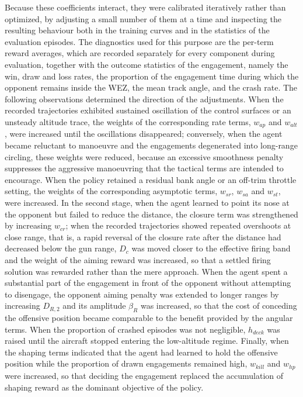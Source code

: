 \documentclass[pdflatex,sn-mathphys-num]{sn-jnl}%
\theoremstyle{thmstyleone}%
\theoremstyle{thmstyletwo}%
\theoremstyle{thmstylethree}%
\begin{document}
Because these coefficients interact, they were calibrated iteratively rather than optimized, by adjusting a small number of them at a time and inspecting the resulting behaviour both in the training curves and in the statistics of the evaluation episodes. The diagnostics used for this purpose are the per-term reward averages, which are recorded separately for every component during evaluation, together with the outcome statistics of the engagement, namely the win, draw and loss rates, the proportion of the engagement time during which the opponent remains inside the WEZ, the mean track angle, and the crash rate. The following observations determined the direction of the adjustments. When the recorded trajectories exhibited sustained oscillation of the control surfaces or an unsteady altitude trace, the weights of the corresponding rate terms, $w_{ap}$ and $w_{alt}$, were increased until the oscillations disappeared; conversely, when the agent became reluctant to manoeuvre and the engagements degenerated into long-range circling, these weights were reduced, because an excessive smoothness penalty suppresses the aggressive manoeuvring that the tactical terms are intended to encourage. When the policy retained a residual bank angle or an off-trim throttle setting, the weights of the corresponding asymptotic terms, $w_{sr}$, $w_{sa}$ and $w_{st}$, were increased. In the second stage, when the agent learned to point its nose at the opponent but failed to reduce the distance, the closure term was strengthened by increasing $w_{cr}$; when the recorded trajectories showed repeated overshoots at close range, that is, a rapid reversal of the closure rate after the distance had decreased below the gun range, $D_{c}$ was moved closer to the effective firing band and the weight of the aiming reward was increased, so that a settled firing solution was rewarded rather than the mere approach. When the agent spent a substantial part of the engagement in front of the opponent without attempting to disengage, the opponent aiming penalty was extended to longer ranges by increasing $D_{R,2}$ and its amplitude $\beta_{R}$ was increased, so that the cost of conceding the offensive position became comparable to the benefit provided by the angular terms. When the proportion of crashed episodes was not negligible, $h_{deck}$ was raised until the aircraft stopped entering the low-altitude regime. Finally, when the shaping terms indicated that the agent had learned to hold the offensive position while the proportion of drawn engagements remained high, $w_{kill}$ and $w_{hp}$ were increased, so that deciding the engagement replaced the accumulation of shaping reward as the dominant objective of the policy.
\end{document}
